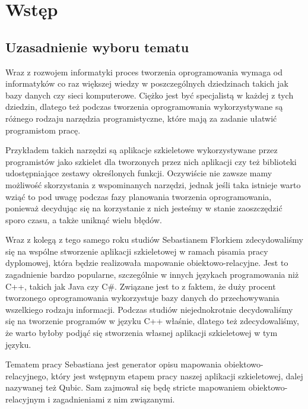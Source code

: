 \documentclass[12pt]{report}
\begin{document}


\tableofcontents

\chapter{Wstęp} \label{wstep}

\section{Uzasadnienie wyboru tematu}

Wraz z rozwojem informatyki proces tworzenia oprogramowania wymaga od informatyków co raz większej wiedzy w poszczególnych dziedzinach takich jak bazy danych 
czy sieci komputerowe. Ciężko jest być specjalistą w każdej z tych dziedzin, dlatego też podczas tworzenia oprogramowania wykorzystywane są różnego rodzaju narzędzia 
programistyczne, które mają za zadanie ułatwić programistom pracę. 

Przykładem takich narzędzi są aplikacje szkieletowe wykorzystywane przez programistów jako szkielet dla tworzonych przez nich aplikacji czy też biblioteki udostępniające 
zestawy określonych funkcji. Oczywiście nie zawsze mamy możliwość skorzystania z wspominanych narzędzi, jednak jeśli taka istnieje warto wziąć to pod uwagę podczas 
fazy planowania tworzenia oprogramowania, ponieważ decydując się na korzystanie z nich jesteśmy w stanie zaoszczędzić sporo czasu, a także uniknąć wielu błędów.

Wraz z kolegą z tego samego roku studiów Sebastianem Florkiem zdecydowaliśmy się na wspólne stworzenie aplikacji szkieletowej w ramach pisamia pracy dyplomowej, 
która będzie realizowała mapowanie obiektowo-relacyjne. Jest to zagadnienie bardzo popularne, szczególnie w innych językach programowania niż C++, takich jak Java 
czy C\#. Związane jest to z faktem, że duży procent tworzonego oprogramowania wykorzystuje bazy danych do przechowywania wszelkiego rodzaju informacji. Podczas 
studiów niejednokrotnie decydowaliśmy się na tworzenie programów w języku C++ właśnie, dlatego też zdecydowaliśmy, że warto byłoby podjąć się stworzenia
własnej aplikacji szkieletowej w tym języku.

Tematem pracy Sebastiana jest generator opisu mapowania obiektowo-relacyjnego, który jest wstępnym etapem pracy naszej aplikacji szkieletowej, dalej nazywanej też
Qubic. Sam zajmował się będę stricte mapowaniem obiektowo-relacyjnym i zagadnieniami z nim związanymi.
\end{document}

